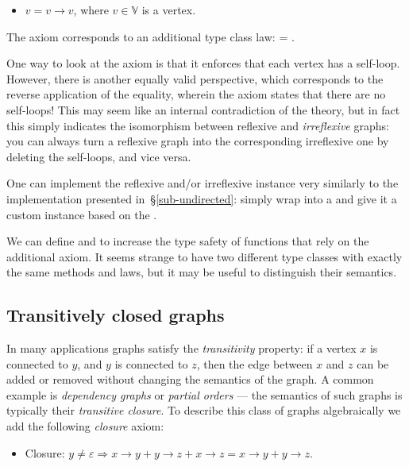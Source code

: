 \begin{itemize}
    \item $v = v \rightarrow v$, where $v\in \mathbb{V}$ is a vertex.
\end{itemize}

\noindent
The axiom corresponds to an additional  type class law:
 = .

One way to look at the axiom is that it enforces that each vertex has a self-loop. However,
there is another equally valid perspective, which corresponds to the reverse application
of the equality, wherein the axiom states that there are no self-loops! This may seem like an
internal contradiction of the theory, but in fact this simply indicates the isomorphism
between reflexive and \emph{irreflexive} graphs: you can always
turn a reflexive graph into the corresponding irreflexive one by deleting the self-loops,
and vice versa.

One can implement the reflexive and/or irreflexive  instance very similarly to
the  implementation presented in~\S\ref{sub-undirected}: simply wrap
 into a  and give it a custom  instance based on the
.

We can define
 and 
to increase the type safety of functions that rely on the additional axiom. It seems
strange to have two different type classes with exactly the same methods and laws, but
it may be useful to distinguish their semantics.

\subsection{Transitively closed graphs}

In many applications graphs satisfy the \emph{transitivity} property: if a vertex $x$ is
connected to $y$, and $y$ is connected to $z$, then the edge between $x$ and $z$ can be
added or removed without changing the semantics of the graph. A common example is
\emph{dependency graphs} or \emph{partial orders} --- the semantics of such graphs is
typically their \emph{transitive closure}.
To describe this class of graphs algebraically we add the following \emph{closure} axiom:

\begin{itemize}
    \item Closure: $y \neq \varepsilon \Rightarrow x \rightarrow y + y \rightarrow z +
    x \rightarrow z = x \rightarrow y + y \rightarrow z$.
\end{itemize}


